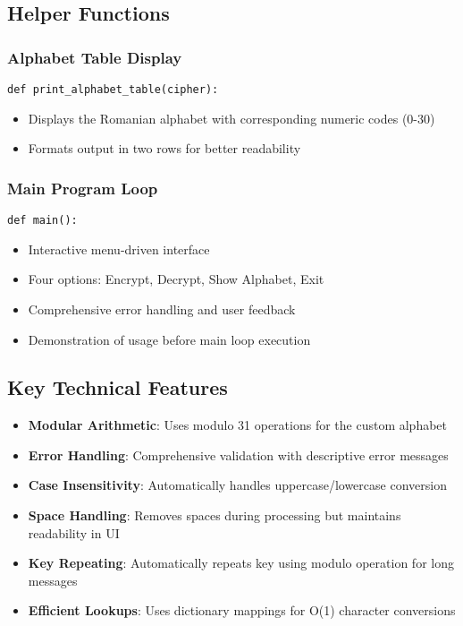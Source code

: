 \documentclass[12pt]{article}
\begin{document}
\subsection*{Helper Functions}
\subsubsection*{Alphabet Table Display}
\begin{verbatim}
def print_alphabet_table(cipher):
\end{verbatim}
\begin{itemize}
    \item Displays the Romanian alphabet with corresponding numeric codes (0-30)
    \item Formats output in two rows for better readability
\end{itemize}

\subsubsection*{Main Program Loop}
\begin{verbatim}
def main():
\end{verbatim}
\begin{itemize}
    \item Interactive menu-driven interface
    \item Four options: Encrypt, Decrypt, Show Alphabet, Exit
    \item Comprehensive error handling and user feedback
    \item Demonstration of usage before main loop execution
\end{itemize}

\subsection*{Key Technical Features}
\begin{itemize}
    \item \textbf{Modular Arithmetic}: Uses modulo 31 operations for the custom alphabet
    \item \textbf{Error Handling}: Comprehensive validation with descriptive error messages
    \item \textbf{Case Insensitivity}: Automatically handles uppercase/lowercase conversion
    \item \textbf{Space Handling}: Removes spaces during processing but maintains readability in UI
    \item \textbf{Key Repeating}: Automatically repeats key using modulo operation for long messages
    \item \textbf{Efficient Lookups}: Uses dictionary mappings for O(1) character conversions
\end{itemize}
\end{document}
